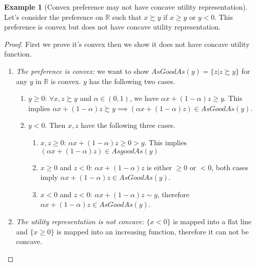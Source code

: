 \documentclass[12pt, a4paper]{article}
\theoremstyle{definition}
\newtheorem{example}{Example}
\begin{document}
\begin{example}[Convex preference may not have concave utility representation]
Let's consider the preference on $\mathbb{R}$ such that $x\succsim y$ if $x\geq y$ or $y<0$. This preference is convex but does not have concave utility representation.
\begin{proof}
First we prove it's convex then we show it does not have concave utility function.
\begin{enumerate}
\item \emph{The preference is convex: }we want to show $AsGoodAs(y)=\{z|z\succsim y\}$ for any $y$ in $\mathbb{R}$ is convex. $y$ has the following two cases.
\begin{enumerate}
\item $y\geq 0$: $\forall x,z\succsim y$ and $\alpha\in (0,1)$, we have $\alpha x + (1-\alpha)z \geq y$. This implies $\alpha x + (1-\alpha)z\succsim y\implies (\alpha x +(1-\alpha)z)\in AsGoodAs(y)$.
\item $y<0$. Then $x,z$ have the following three cases.
\begin{enumerate}
\item $x,z\geq 0$: $\alpha x+(1-\alpha)z\geq 0> y$. This implies $(\alpha x +(1-\alpha)z) \in AsgoodAs(y)$
\item $x\geq 0$ and $z<0$: $\alpha x + (1-\alpha)z$ is either $\geq 0$ or $<0$, both cases imply $\alpha x + (1-\alpha)z \in AsGoodAs(y)$.
\item $x<0$ and $z<0$: $\alpha x + (1-\alpha)z \sim y$, therefore $\alpha x + (1-\alpha)z\in AsGoodAs(y)$. 
\end{enumerate}
\end{enumerate} 
\item \emph{The utility representation is not concave: }$\{x<0\}$ is mapped into a flat line and $\{x\geq0\}$ is mapped into an increasing function, therefore it can not be concave.
\end{enumerate}
\end{proof}
\end{example}
\end{document}
